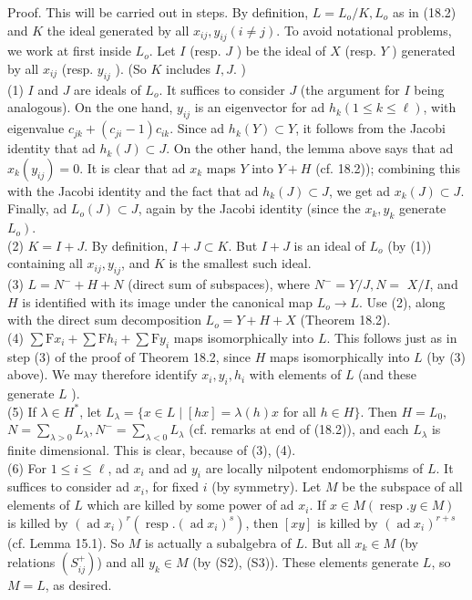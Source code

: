 \documentclass[10pt]{article}
\begin{document}
Proof. This will be carried out in steps. By definition, $L=L_{o} / K, L_{o}$ as in (18.2) and $K$ the ideal generated by all $x_{i j}, y_{i j}(i \neq j)$. To avoid notational problems, we work at first inside $L_{o}$. Let $I$ (resp. $J$ ) be the ideal of $X$ (resp. $Y$ ) generated by all $x_{i j}$ (resp. $y_{i j}$ ). (So $K$ includes $I, J$. )\\
(1) $I$ and $J$ are ideals of $L_{o}$. It suffices to consider $J$ (the argument for $I$ being analogous). On the one hand, $y_{i j}$ is an eigenvector for ad $h_{k}(1 \leq k \leq \ell)$, with eigenvalue $c_{j k}+\left(c_{j i}-1\right) c_{i k}$. Since ad $h_{k}(Y) \subset Y$, it follows from the Jacobi identity that ad $h_{k}(J) \subset J$. On the other hand, the lemma above says that ad $x_{k}\left(y_{i j}\right)=0$. It is clear that ad $x_{k}$ maps $Y$ into $Y+H$ (cf. 18.2)); combining this with the Jacobi identity and the fact that ad $h_{k}(J) \subset J$, we get ad $x_{k}(J) \subset J$. Finally, ad $L_{o}(J) \subset J$, again by the Jacobi identity (since the $x_{k}, y_{k}$ generate $\left.L_{o}\right)$.\\
(2) $K=I+J$. By definition, $I+J \subset K$. But $I+J$ is an ideal of $L_{o}$ (by (1)) containing all $x_{i j}, y_{i j}$, and $K$ is the smallest such ideal.\\
(3) $L=N^{-}+H+N$ (direct sum of subspaces), where $N^{-}=Y / J, N=$ $X / I$, and $H$ is identified with its image under the canonical map $L_{o} \rightarrow L$. Use (2), along with the direct sum decomposition $L_{o}=Y+H+X$ (Theorem 18.2).\\
(4) $\sum \mathrm{F} x_{i}+\sum \mathrm{F} h_{i}+\sum \mathrm{F} y_{i}$ maps isomorphically into $L$. This follows just as in step (3) of the proof of Theorem 18.2, since $H$ maps isomorphically into $L$ (by (3) above). We may therefore identify $x_{i}, y_{i}, h_{i}$ with elements of $L$ (and these generate $L$ ).\\
(5) If $\lambda \in H^{*}$, let $L_{\lambda}=\{x \in L \mid[h x]=\lambda(h) x$ for all $h \in H\}$. Then $H=L_{0}$, $N=\sum_{\lambda>0} L_{\lambda}, N^{-}=\sum_{\lambda<0} L_{\lambda}$ (cf. remarks at end of (18.2)), and each $L_{\lambda}$ is finite dimensional. This is clear, because of (3), (4).\\
(6) For $1 \leq i \leq \ell$, ad $x_{i}$ and ad $y_{i}$ are locally nilpotent endomorphisms of $L$. It suffices to consider ad $x_{i}$, for fixed $i$ (by symmetry). Let $M$ be the subspace of all elements of $L$ which are killed by some power of ad $x_{i}$. If $x \in M(\operatorname{resp} . y \in M)$ is killed by $\left(\operatorname{ad} x_{i}\right)^{r}\left(\operatorname{resp} .\left(\operatorname{ad} x_{i}\right)^{s}\right)$, then $[x y]$ is killed by $\left(\operatorname{ad} x_{i}\right)^{r+s}$ (cf. Lemma 15.1). So $M$ is actually a subalgebra of $L$. But all $x_{k} \in M$ (by relations $\left(S_{i j}^{+}\right)$) and all $y_{k} \in M$ (by (S2), (S3)). These elements generate $L$, so $M=L$, as desired.\\
\end{document}
